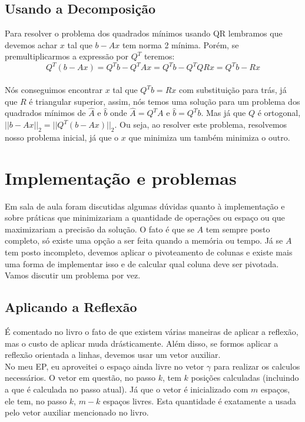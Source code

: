 \documentclass[
10pt, %
a4paper, %
oneside, %
headinclude,footinclude, %
BCOR5mm, %
]{scrartcl}
\begin{document}
\subsection{Usando a Decomposição}
Para resolver o problema dos quadrados mínimos usando QR lembramos que devemos achar $x$ tal que $b-Ax$ tem norma 2 mínima. Porém, se premultiplicarmos a expressão por $Q^T$ teremos: \\
$$ Q^T(b-Ax) = Q^Tb - Q^TAx = Q^Tb - Q^TQRx = Q^Tb - Rx$$ \\
Nós conseguimos encontrar $x$ tal que $Q^Tb = Rx$ com substituição para trás, já que $R$ é triangular superior, assim, nós temos uma solução para um problema dos quadrados mínimos de $\hat{A}$ e $\hat{b}$ onde $\hat{A} = Q^TA$ e $\hat{b} = Q^Tb$. Mas já que $Q$ é ortogonal, $||b-Ax||_2 = ||Q^T(b-Ax)||_2$. Ou seja, ao resolver este problema, resolvemos nosso problema inicial, já que o $x$ que minimiza um também minimiza o outro.

\section{Implementação e problemas}
Em sala de aula foram discutidas algumas dúvidas quanto à implementação e sobre práticas que minimizariam a quantidade de operações ou espaço ou que maximizariam a precisão da solução. O fato é que se $A$ tem sempre posto completo, só existe uma opção a ser feita quando a memória ou tempo. Já se $A$ tem posto incompleto, devemos aplicar o pivoteamento de colunas e existe mais uma forma de implementar isso e de calcular qual coluna deve ser pivotada. Vamos discutir um problema por vez.

\subsection{Aplicando a Reflexão}
É comentado no livro o fato de que existem várias maneiras de aplicar a reflexão, mas o custo de aplicar muda drásticamente. Além disso, se formos aplicar a reflexão orientada a linhas, devemos usar um vetor auxiliar. \\
No meu EP, eu aproveitei o espaço ainda livre no vetor $\gamma$ para realizar os calculos necessários. O vetor em questão, no passo $k$, tem $k$ posições calculadas (incluindo a que é calculada no passo atual). Já que o vetor é inicializado com $m$ espaços, ele tem, no passo $k$, $m-k$ espaços livres. Esta quantidade é exatamente a usada pelo vetor auxiliar mencionado no livro.
 
\end{document}

